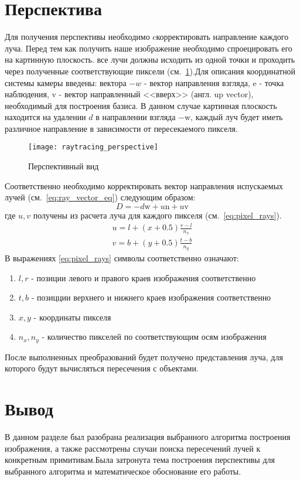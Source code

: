 \section{Перспектива}
Для получения перспективы необходимо cкорректировать направление каждого луча. Перед тем как получить наше изображение необходимо спроецировать его на картинную плоскость.
все лучи должны исходить из одной точки и проходить через полученные соответствующие пиксели (см.~\ref{fig:perspective_view}).Для описания координатной системы камеры введены:
вектора $-w$ - вектор направления взгляда, $\mathrm{e}$ - точка наблюдения, $\mathrm{v}$ - вектор направленный <<вверх>> (англ. up vector), необходимый для построения базиса.
В данном случае картинная плоскость находится на удалении $d$ в направлении взгляда $\mathrm{-w}$, каждый луч будет иметь различное направление в зависимости от пересекаемого пикселя.
\begin{figure}[H]
	\centering
	\texttt{[image: raytracing\_perspective]}
	\caption{Перспективный вид}
	\label{fig:perspective_view}
\end{figure}
Соответственно необходимо корректировать вектор направления испускаемых лучей (см.~\ref{eq:ray_vector_eq}) следующим образом:
\begin{equation}
	D = -d\mathrm{w} + u\mathrm{n} + u\mathrm{v}
\end{equation}
где $u,v$ получены из расчета луча для каждого пикселя (см.~\ref{eq:pixel_rays}).
\begin{equation}
	\begin{aligned}
		u = l + (x + 0.5)\frac{r - l}{n_x}\\
		v = b + (y + 0.5)\frac{t - b}{n_y}
	\end{aligned}
	\label{eq:pixel_rays}
\end{equation}
В выражениях \ref{eq:pixel_rays} символы соответственно означают:
\begin{enumerate}
	\item $l,r$ - позиции левого  и правого краев изображения соответственно
	\item $t,b$ - позицции верхнего и нижнего краев изображения соответственно
	\item $x,y$ - координаты пикселя
	\item $n_x,n_y$ - количество пикселей по соответствующим осям изображения
\end{enumerate}
После выполненных преобразований будет получено представления луча, для которого будут вычисляться
пересечения с объектами.\cite{perspective_raytracing}

\section{Вывод}
В данном разделе был разобрана реализация выбранного алгоритма построения изображения, а также рассмотрены случаи поиска пересечений лучей  к конкретным примитивам.Была затронута 
тема построения перспективы для выбранного алгоритма и математическое обоснование его работы.
